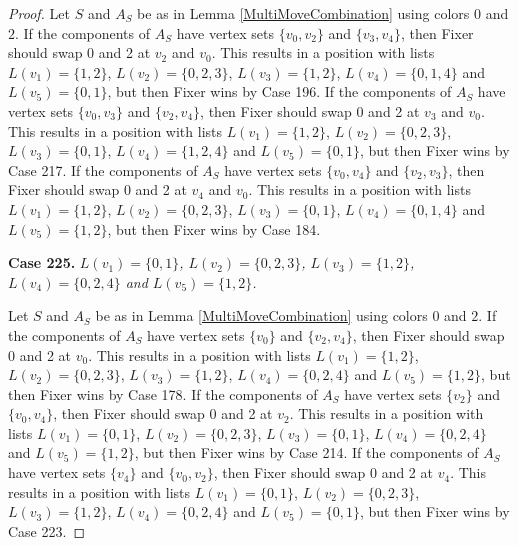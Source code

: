 \documentclass[12pt]{amsart}
\theoremstyle{plain}
\theoremstyle{definition}
\theoremstyle{remark}
\begin{document}
\begin{proof}
Let $S$ and $A_S$ be as in Lemma \ref{MultiMoveCombination} using colors $0$ and $2$. If the components of $A_S$ have vertex sets $\{v_0, v_2\}$ and $\{v_3, v_4\}$, then Fixer should swap 0 and 2 at $v_2$ and $v_0$. This results in a position with lists $L(v_1) = \{1, 2\}$, $L(v_2) = \{0, 2, 3\}$, $L(v_3) = \{1, 2\}$, $L(v_4) = \{0, 1, 4\}$ and $L(v_5) = \{0, 1\}$, but then Fixer wins by Case 196.
If the components of $A_S$ have vertex sets $\{v_0, v_3\}$ and $\{v_2, v_4\}$, then Fixer should swap 0 and 2 at $v_3$ and $v_0$. This results in a position with lists $L(v_1) = \{1, 2\}$, $L(v_2) = \{0, 2, 3\}$, $L(v_3) = \{0, 1\}$, $L(v_4) = \{1, 2, 4\}$ and $L(v_5) = \{0, 1\}$, but then Fixer wins by Case 217.
If the components of $A_S$ have vertex sets $\{v_0, v_4\}$ and $\{v_2, v_3\}$, then Fixer should swap 0 and 2 at $v_4$ and $v_0$. This results in a position with lists $L(v_1) = \{1, 2\}$, $L(v_2) = \{0, 2, 3\}$, $L(v_3) = \{0, 1\}$, $L(v_4) = \{0, 1, 4\}$ and $L(v_5) = \{1, 2\}$, but then Fixer wins by Case 184.

\noindent\textbf{Case 225.  }\textit{$L(v_1) = \{0, 1\}$, $L(v_2) = \{0, 2, 3\}$, $L(v_3) = \{1, 2\}$, $L(v_4) = \{0, 2, 4\}$ and $L(v_5) = \{1, 2\}$.}

Let $S$ and $A_S$ be as in Lemma \ref{MultiMoveCombination} using colors $0$ and $2$. If the components of $A_S$ have vertex sets $\{v_0\}$ and $\{v_2, v_4\}$, then Fixer should swap 0 and 2 at $v_0$. This results in a position with lists $L(v_1) = \{1, 2\}$, $L(v_2) = \{0, 2, 3\}$, $L(v_3) = \{1, 2\}$, $L(v_4) = \{0, 2, 4\}$ and $L(v_5) = \{1, 2\}$, but then Fixer wins by Case 178.
If the components of $A_S$ have vertex sets $\{v_2\}$ and $\{v_0, v_4\}$, then Fixer should swap 0 and 2 at $v_2$. This results in a position with lists $L(v_1) = \{0, 1\}$, $L(v_2) = \{0, 2, 3\}$, $L(v_3) = \{0, 1\}$, $L(v_4) = \{0, 2, 4\}$ and $L(v_5) = \{1, 2\}$, but then Fixer wins by Case 214.
If the components of $A_S$ have vertex sets $\{v_4\}$ and $\{v_0, v_2\}$, then Fixer should swap 0 and 2 at $v_4$. This results in a position with lists $L(v_1) = \{0, 1\}$, $L(v_2) = \{0, 2, 3\}$, $L(v_3) = \{1, 2\}$, $L(v_4) = \{0, 2, 4\}$ and $L(v_5) = \{0, 1\}$, but then Fixer wins by Case 223.

\end{proof}
\end{document}
